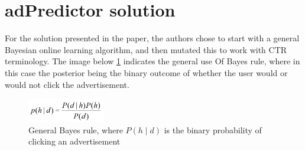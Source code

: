 \documentclass[journal]{IEEEtran}
\begin{document}
\section{adPredictor solution}
For the solution presented in the paper, the authors chose to start with a general Bayesian online learning algorithm, and then mutated this to work with CTR terminology. The image below \ref{fig:bayes} indicates the general use Of Bayes rule, where in this case the posterior being the binary outcome of whether the user would or would not click the advertisement. \par

\begin{figure}[!ht]
  \caption{General Bayes rule, where \(P(h \mid d)\) is the binary probability of clicking an advertisement}
  \centering
  \label{fig:bayes}
    \includegraphics[width=0.3\textwidth]{bayes}
\end{figure}
\end{document}
